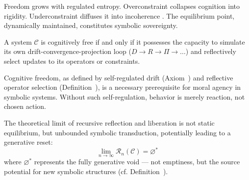 \begin{corollary}
\label{corollary:bk9_freedomentropy_complementarity}
Freedom grows with regulated entropy. Overconstraint collapses cognition into rigidity. Underconstraint diffuses it into incoherence
\label{axiom:bk9_drift_entropy_coherence_limit}. The equilibrium point, dynamically maintained, constitutes symbolic sovereignty.
\end{corollary}
\begin{corollary}
\label{corollary:bk9_selfreferential_capacity}
A system $\mathcal{C}$ is cognitively free if and only if it possesses the capacity to simulate its own drift-convergence-projection loop ($D \to R \to \Pi \to \dots$) and reflectively select updates to its operators or constraints.
\end{corollary}
\begin{corollary}
\label{corollary:bk9_emergence_of_moral_agency}
Cognitive freedom, as defined by self-regulated drift (Axiom~) and reflective operator selection (Definition~), is a necessary prerequisite for moral agency in symbolic systems. Without such self-regulation, behavior is merely reaction, not chosen action.
\end{corollary}
\begin{corollary}
\label{corollary:bk9_final_collapse_inversion_principle}
The theoretical limit of recursive reflection and liberation is not static equilibrium, but unbounded symbolic transduction, potentially leading to a generative reset:
\[
\lim_{n\to\infty} \mathcal{R}_n(\mathcal{C}) = \varnothing^*
\]
where $\varnothing^*$ represents the fully generative void — not emptiness, but the source potential for new symbolic structures (cf. Definition~).
\end{corollary}
